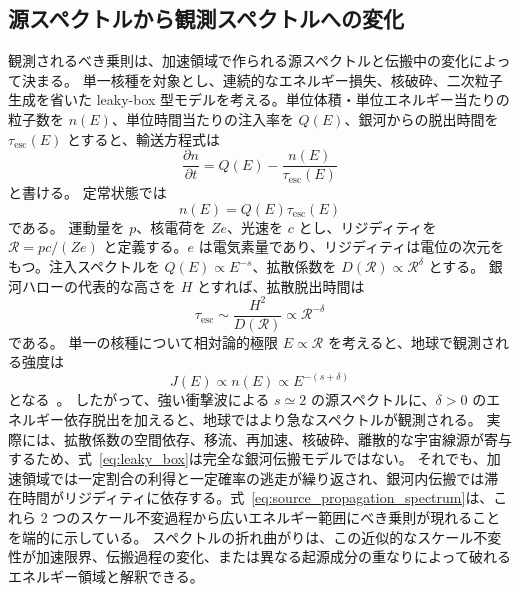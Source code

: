\documentclass[book,paper=a4,fontsize=11pt]{jlreq}
\begin{document}
\subsection{源スペクトルから観測スペクトルへの変化}
観測されるべき乗則は、加速領域で作られる源スペクトルと伝搬中の変化によって決まる。
単一核種を対象とし、連続的なエネルギー損失、核破砕、二次粒子生成を省いた leaky-box 型モデルを考える。単位体積・単位エネルギー当たりの粒子数を \(n(E)\)、単位時間当たりの注入率を \(Q(E)\)、銀河からの脱出時間を \(\tau_{\mathrm{esc}}(E)\) とすると、輸送方程式は
\begin{equation}
  \frac{\partial n}{\partial t}
  =Q(E)-\frac{n(E)}{\tau_{\mathrm{esc}}(E)}
  \label{eq:leaky_box}
\end{equation}
と書ける。
定常状態では
\begin{equation}
  n(E)=Q(E)\tau_{\mathrm{esc}}(E)
\end{equation}
である。
運動量を \(p\)、核電荷を \(Ze\)、光速を \(c\) とし、リジディティを \(\mathcal R=pc/(Ze)\) と定義する。\(e\) は電気素量であり、リジディティは電位の次元をもつ。注入スペクトルを \(Q(E)\propto E^{-s}\)、拡散係数を \(D(\mathcal{R})\propto\mathcal{R}^{\delta}\) とする。
銀河ハローの代表的な高さを \(H\) とすれば、拡散脱出時間は
\begin{equation}
  \tau_{\mathrm{esc}}
  \sim \frac{H^2}{D(\mathcal{R})}
  \propto \mathcal{R}^{-\delta}
\end{equation}
である。
単一の核種について相対論的極限 \(E\propto\mathcal{R}\) を考えると、地球で観測される強度は
\begin{equation}
  J(E)\propto n(E)\propto E^{-(s+\delta)}
  \label{eq:source_propagation_spectrum}
\end{equation}
となる~\cite{Strong2007,Gabici2019}。
したがって、強い衝撃波による \(s\simeq2\) の源スペクトルに、\(\delta>0\) のエネルギー依存脱出を加えると、地球ではより急なスペクトルが観測される。
実際には、拡散係数の空間依存、移流、再加速、核破砕、離散的な宇宙線源が寄与するため、式~\eqref{eq:leaky_box}は完全な銀河伝搬モデルではない。
それでも、加速領域では一定割合の利得と一定確率の逃走が繰り返され、銀河内伝搬では滞在時間がリジディティに依存する。式~\eqref{eq:source_propagation_spectrum}は、これら 2 つのスケール不変過程から広いエネルギー範囲にべき乗則が現れることを端的に示している。
スペクトルの折れ曲がりは、この近似的なスケール不変性が加速限界、伝搬過程の変化、または異なる起源成分の重なりによって破れるエネルギー領域と解釈できる。
\end{document}
